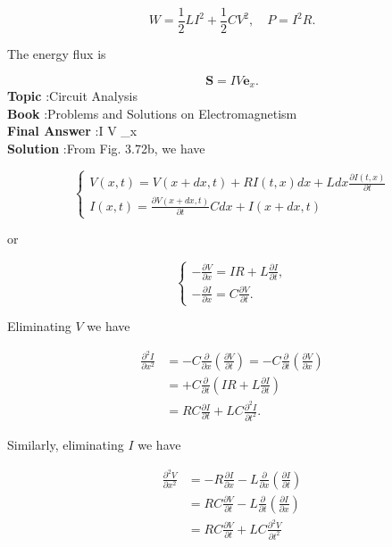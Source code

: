 \documentclass[10pt]{article}
\begin{document}
$$
W=\frac{1}{2} L I^{2}+\frac{1}{2} C V^{2}, \quad P=I^{2} R .
$$

The energy flux is

$$
\mathbf{S}=I V \mathbf{e}_{x} .
$$
\textbf{Topic} :Circuit Analysis\\
\textbf{Book} :Problems and Solutions on Electromagnetism\\
\textbf{Final Answer} :I V _{x}\\


\textbf{Solution} :From Fig. 3.72b, we have

$$
\left\{\begin{array}{l}
V(x, t)=V(x+d x, t)+R I(t, x) d x+L d x \frac{\partial I(t, x)}{\partial t} \\
I(x, t)=\frac{\partial V(x+d x, t)}{\partial t} C d x+I(x+d x, t)
\end{array}\right.
$$

or

$$
\left\{\begin{array}{l}
-\frac{\partial V}{\partial x}=I R+L \frac{\partial I}{\partial t}, \\
-\frac{\partial I}{\partial x}=C \frac{\partial V}{\partial t} .
\end{array}\right.
$$

Eliminating $V$ we have

$$
\begin{aligned}
\frac{\partial^{2} I}{\partial x^{2}} &=-C \frac{\partial}{\partial x}\left(\frac{\partial V}{\partial t}\right)=-C \frac{\partial}{\partial t}\left(\frac{\partial V}{\partial x}\right) \\
&=+C \frac{\partial}{\partial t}\left(I R+L \frac{\partial I}{\partial t}\right) \\
&=R C \frac{\partial I}{\partial t}+L C \frac{\partial^{2} I}{\partial t^{2}} .
\end{aligned}
$$

 Similarly, eliminating $I$ we have

$$
\begin{aligned}
\frac{\partial^{2} V}{\partial x^{2}} &=-R \frac{\partial I}{\partial x}-L \frac{\partial}{\partial x}\left(\frac{\partial I}{\partial t}\right) \\
&=R C \frac{\partial V}{\partial t}-L \frac{\partial}{\partial t}\left(\frac{\partial I}{\partial x}\right) \\
&=R C \frac{\partial V}{\partial t}+L C \frac{\partial^{2} V}{\partial t^{2}}
\end{aligned}
$$
\end{document}
